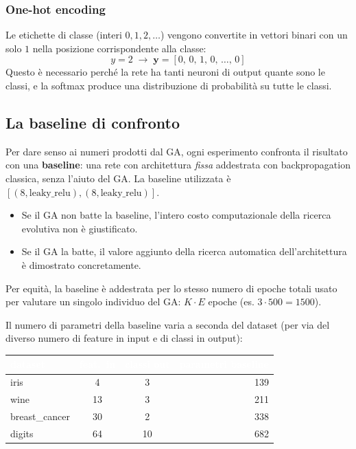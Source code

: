 \documentclass[11pt,a4paper]{article}
\begin{document}
\subsubsection{One-hot encoding}

Le etichette di classe (interi $0, 1, 2, \ldots$) vengono convertite in
vettori binari con un solo $1$ nella posizione corrispondente alla classe:
\[
    y = 2 \;\rightarrow\; \bm{y} = [0,\, 0,\, 1,\, 0,\, \ldots,\, 0]
\]
Questo è necessario perché la rete ha tanti neuroni di output quante sono
le classi, e la softmax produce una distribuzione di probabilità su tutte
le classi.

\subsection{La baseline di confronto}

Per dare senso ai numeri prodotti dal GA, ogni esperimento confronta il
risultato con una \textbf{baseline}: una rete con architettura
\emph{fissa} addestrata con backpropagation classica, senza l'aiuto del
GA. La baseline utilizzata è $[(8,\text{leaky\_relu}), (8,\text{leaky\_relu})]$.

\begin{itemize}
    \item Se il GA non batte la baseline, l'intero costo computazionale
          della ricerca evolutiva non è giustificato.
    \item Se il GA la batte, il valore aggiunto della ricerca automatica
          dell'architettura è dimostrato concretamente.
\end{itemize}

Per equità, la baseline è addestrata per lo stesso numero di epoche
totali usato per valutare un singolo individuo del GA: $K \cdot E$ epoche
(es. $3 \cdot 500 = 1500$).

Il numero di parametri della baseline varia a seconda del dataset (per via
del diverso numero di feature in input e di classi in output):

\begin{center}
\begin{tabular}{lccr}
    \toprule
    \rowcolor{headerblue}
    \textcolor{white}{\textbf{dataset}} &
    \textcolor{white}{\textbf{feat.~in}} &
    \textcolor{white}{\textbf{classi out}} &
    \textcolor{white}{\textbf{parametri baseline}} \\
    \midrule
    iris           &  4 &  3 & 139 \\
    \rowcolor{rowgray}
    wine           & 13 &  3 & 211 \\
    breast\_cancer & 30 &  2 & 338 \\
    \rowcolor{rowgray}
    digits         & 64 & 10 & 682 \\
    \bottomrule
\end{tabular}
\end{center}
\end{document}
